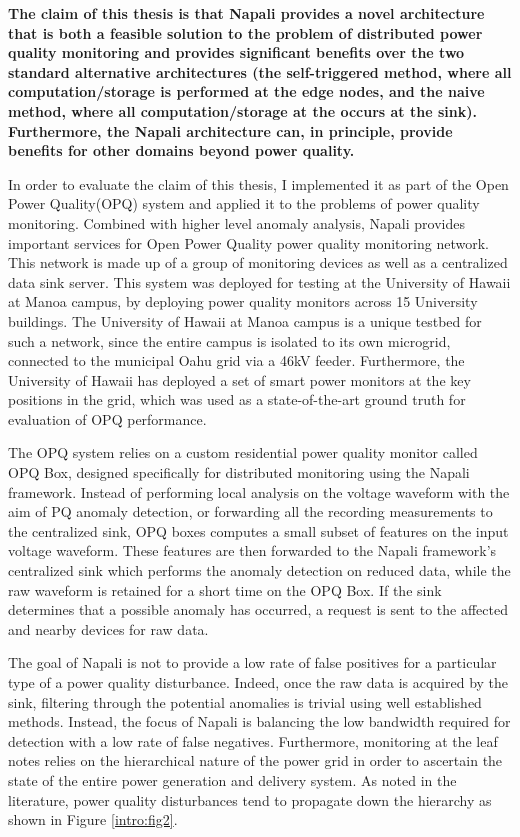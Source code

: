 \begin{tcolorbox}
\textbf{The claim of this thesis is that Napali provides a novel architecture that is both a feasible solution to the problem of distributed power quality monitoring and provides significant benefits over the two standard alternative architectures (the self-triggered method, where all computation/storage is performed at the edge nodes, and the naive method, where all computation/storage at the occurs at the sink).
Furthermore, the Napali architecture can, in principle, provide benefits for other domains beyond power quality.}
\end{tcolorbox}
In order to evaluate the claim of this thesis, I implemented it as part of the Open Power Quality(OPQ) system and applied it to the problems of power quality monitoring.
Combined with higher level anomaly analysis, Napali provides important services for Open Power Quality power quality monitoring network.
This network is made up of a group of monitoring devices as well as a centralized data sink server.
This system was deployed for testing at the University of Hawaii at Manoa campus, by deploying power quality monitors across 15 University buildings.
The University of Hawaii at Manoa campus is a unique testbed for such a network, since the entire campus is isolated to its own microgrid, connected to the municipal Oahu grid via a 46kV feeder.
Furthermore, the University of Hawaii has deployed a set of smart power monitors at the key positions in the grid, which was used as a state-of-the-art ground truth for evaluation of OPQ performance.

The OPQ system relies on a custom residential power quality monitor called OPQ Box, designed specifically for distributed monitoring using the Napali framework.
Instead of performing local analysis on the voltage waveform with the aim of PQ anomaly detection, or forwarding all the recording measurements to the centralized sink, OPQ boxes computes a small subset of features on the input voltage waveform.
These features are then forwarded to the Napali framework's centralized sink which performs the anomaly detection on reduced data, while the raw waveform is retained for a short time on the OPQ Box.
If the sink determines that a possible anomaly has occurred, a request is sent to the affected and nearby devices for raw data.

The goal of Napali is not to provide a low rate of false positives for a particular type of a power quality disturbance.
Indeed, once the raw data is acquired by the sink, filtering through the potential anomalies is trivial using well established methods.
Instead, the focus of Napali is balancing the low bandwidth required for detection with a low rate of false negatives.
Furthermore, monitoring at the leaf notes relies on the hierarchical nature of the power grid in order to ascertain the state of the entire power generation and delivery system.
As noted in the literature, power quality disturbances tend to propagate down the hierarchy as shown in Figure \ref{intro:fig2}.



